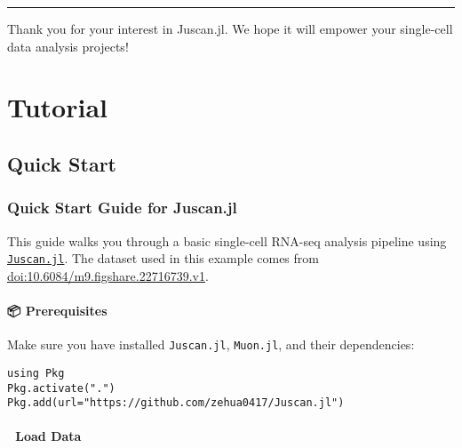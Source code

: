 \documentclass[oneside]{memoir}
\begin{document}
{\rule{\textwidth}{1pt}}


Thank you for your interest in Juscan.jl. We hope it will empower your single-cell data analysis projects!



\part{Tutorial}


\chapter{Quick Start}


\section{Quick Start Guide for Juscan.jl}



\label{12683719284981916232}{}


This guide walks you through a basic single-cell RNA-seq analysis pipeline using \href{https://github.com/zehua0417/Juscan.jl}{\texttt{Juscan.jl}}. The dataset used in this example comes from \href{https://doi.org/10.6084/m9.figshare.22716739.v1}{doi:10.6084/m9.figshare.22716739.v1}.



\subsection{📦 Prerequisites}



\label{15702409122439959613}{}


Make sure you have installed \texttt{Juscan.jl}, \texttt{Muon.jl}, and their dependencies:




\begin{verbatim}
using Pkg
Pkg.activate(".")
Pkg.add(url="https://github.com/zehua0417/Juscan.jl")
\end{verbatim}



\subsection{📁 Load Data}



\label{2195623716691941297}{}
\end{document}
